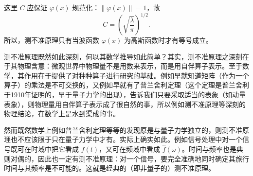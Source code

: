 这里 $C$ 应保证 $\varphi(x)$ 规范化：$\|\varphi(x)\|=1$，故
\[
 C=\left(\sqrt{\frac{\lambda}{\pi}}\right)^{1/2}.
\]
所以，测不准原理只有当波函数 $\varphi(x)$ 为高斯函数时才有等号成立。

测不准原理既然如此深刻，何以其数学推导如此简单？其实，测不准原理之深刻在于其物理含意：微观世界中物理量不是用数来表示，而是用自伴算子表示。至于数学，其作用在于提供了对种种算子进行研究的基础。例如早就知道矩阵（作为一个算子）的乘法是不可交换的，又例如早就有了普兰舍利定理（这个定理是普兰舍利于1910年证明的，早于量子力学的出现），告诉我们只要采取适当的表象（如动量表象），则物理量用自伴算子表示成了很自然的事，所以例如测不准原理等深刻的物理结论，在数学上是水到渠成的事。

然而既然数学上例如普兰舍利定理等等的发现原是与量子力学独立的，则测不准原理也不应该限于只在量子力学中才有。实际上确实如此。例如信号处理中对一个信号既可在时域中把它看成 $f(t)$，又可在频域中看成 $\widehat f(\omega)$。时间与频率也是典则对偶的，因此也一定有测不准原理：对一个信号，要完全准确地同时确定其旅行时间与其频率是不可能的。这就是经典的（即非量子的）测不准原理。

